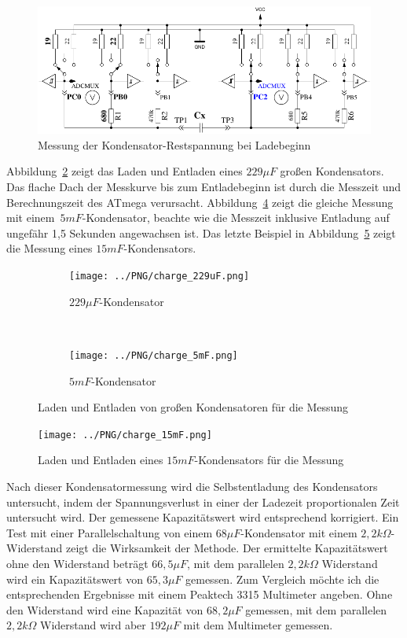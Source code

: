 \begin{figure}[H]
\centering
\includegraphics[]{../FIG/Cap_residV.pdf}
\caption{Messung der Kondensator-Restspannung bei Ladebeginn}
\label{fig:CapResidV}
\end{figure}

Abbildung~\ref{pic:c229} zeigt das Laden und Entladen eines \(229\mu F\) großen Kondensators.
Das flache Dach der Messkurve bis zum Entladebeginn ist durch die Messzeit und Berechnungszeit des ATmega verursacht.
Abbildung~\ref{pic:c5mF} zeigt die gleiche Messung mit einem~\(5mF\)-Kondensator,
beachte wie die Messzeit inklusive Entladung auf ungefähr 1,5 Sekunden angewachsen ist.
Das letzte Beispiel in Abbildung~\ref{pic:c15mF} zeigt die Messung eines \(15mF\)-Kondensators.

\begin{figure}[H]
  \begin{subfigure}[b]{9cm}
    \centering
    \texttt{[image: ../PNG/charge\_229uF.png]}
    \caption{\(229\mu F\)-Kondensator}
    \label{pic:c229}
  \end{subfigure}
  ~
  \begin{subfigure}[b]{9cm}
    \centering
    \texttt{[image: ../PNG/charge\_5mF.png]}
    \caption{\(5mF\)-Kondensator}
    \label{pic:c5mF}
  \end{subfigure}
  \caption{Laden und Entladen von großen Kondensatoren für die Messung}
\end{figure}

\begin{figure}[H]
  \centering
    \texttt{[image: ../PNG/charge\_15mF.png]}
  \caption{Laden und Entladen eines \(15mF\)-Kondensators für die Messung}
  \label{pic:c15mF}
\end{figure}

Nach dieser Kondensatormessung wird die Selbstentladung des Kondensators untersucht, indem der
Spannungsverlust in einer der Ladezeit proportionalen Zeit untersucht wird.
Der gemessene Kapazitätswert wird entsprechend korrigiert. Ein Test mit einer Parallelschaltung von
einem \(68\mu F\)-Kondensator mit einem \(2,2k\Omega\)-Widerstand zeigt die
Wirksamkeit der Methode. Der ermittelte Kapazitätswert ohne den Widerstand beträgt \(66,5\mu F\),
mit dem parallelen \(2,2k\Omega\) Widerstand wird ein Kapazitätswert von \(65,3\mu F\) gemessen.
Zum Vergleich möchte ich die entsprechenden Ergebnisse mit einem Peaktech 3315 Multimeter angeben.
Ohne den Widerstand wird eine Kapazität von \(68,2\mu F\) gemessen, mit dem parallelen \(2,2k\Omega\)
Widerstand wird aber \(192\mu F\) mit dem Multimeter gemessen.

